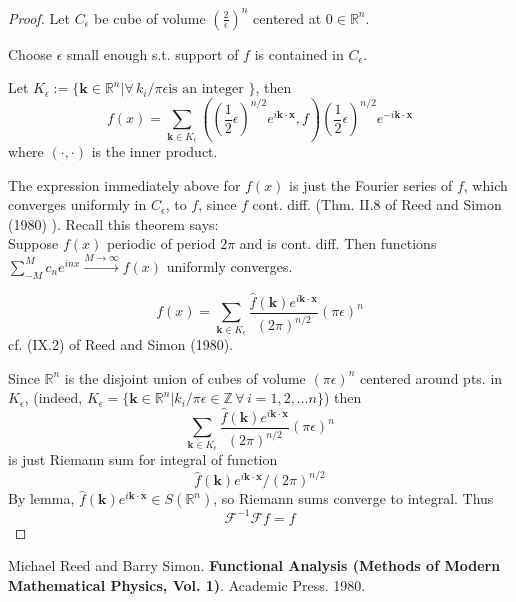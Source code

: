 \documentclass[10pt]{amsart}
\begin{document}
\begin{multicols*}{2}
\begin{proof}
Let $C_{\epsilon}$ be cube of volume $\left( \frac{2}{\epsilon}\right)^n$ centered at $0\in \mathbb{R}^n$.  

Choose $\epsilon$ small enough s.t. support of $f$ is contained in $C_{\epsilon}$.  

Let $K_{\epsilon} := \lbrace \mathbf{k} \in \mathbb{R}^n | \forall \, k_i / \pi \epsilon \text{is an integer } \rbrace$, then 
\[
f(x) = \sum_{\mathbf{k} \in K_{\epsilon}}    ((\frac{1}{2} \epsilon)^{n/2} e^{i\mathbf{k}\cdot \mathbf{x}}, f) (\frac{1}{2} \epsilon)^{n/2} e^{-i \mathbf{k} \cdot \mathbf{x}} 
\]
where $(\cdot,\cdot )$ is the inner product.  

The expression immediately above for $f(x)$ is just the Fourier series of $f$, which converges uniformly in $C_{\epsilon}$, to $f$, since $f$ cont. diff. (Thm. II.8 of Reed and Simon (1980) \cite{ReSi1980}).  Recall this theorem says:  \\
Suppose $f(x)$ periodic of period $2\pi$ and is cont. diff.  Then functions $\sum_{-M}^{M} c_n e^{inx} \xrightarrow{M\to \infty} f(x)$ uniformly converges.  

\begin{equation}
f(x) = \sum_{\mathbf{k} \in K_{\epsilon} } \frac{\widehat{f}(\mathbf{k}) e^{i\mathbf{k}\cdot \mathbf{x}} }{ (2\pi)^{n/2} } (\pi \epsilon)^n 
\end{equation}
cf. (IX.2) of Reed and Simon (1980)\cite{ReSi1980}.  

Since $\mathbb{R}^n $ is the disjoint union of cubes of volume $(\pi \epsilon)^n$ centered around pts. in $K_{\epsilon}$, (indeed, $K_{\epsilon} = \lbrace \mathbf{k} \in \mathbb{R}^n | k_i/\pi \epsilon \in \mathbb{Z} \, \forall \, i=1,2,\dots n\rbrace$) then 
\[
\sum_{\mathbf{k} \in K_{\epsilon} } \frac{\widehat{f}(\mathbf{k}) e^{i \mathbf{k}\cdot \mathbf{x} } }{ (2\pi )^{n/2} } (\pi \epsilon)^n 
\]
is just Riemann sum for integral of function 
\[
\widehat{f}(\mathbf{k}) e^{i\mathbf{k}\cdot \mathbf{x} } /(2\pi)^{n/2}
\]
By lemma, $\widehat{f}(\mathbf{k})e^{i\mathbf{k}\cdot \mathbf{x} } \in S(\mathbb{R}^n)$, so Riemann sums converge to integral.  Thus 
\[
\mathcal{F}^{-1}\mathcal{F}f = f
\]

	\end{proof}








\end{multicols*}


\begin{thebibliography}{9}
	
Michael Reed and Barry Simon. \textbf{Functional Analysis (Methods of Modern Mathematical Physics, Vol. 1)}.  Academic Press.  1980.  	
	
	
\end{thebibliography}
\end{document}
